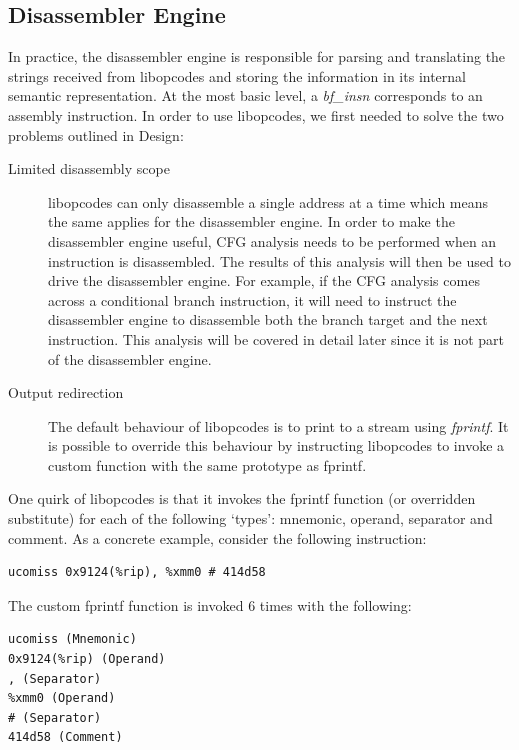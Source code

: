 \subsection{Disassembler Engine}

In practice, the disassembler engine is responsible for parsing and translating the strings received from libopcodes and storing the information in its internal semantic representation. At the most basic level, a \emph{bf\_insn} corresponds to an assembly instruction. In order to use libopcodes, we first needed to solve the two problems outlined in Design:

\begin{description}
\item [Limited disassembly scope] libopcodes can only disassemble a single address at a time which means the same applies for the disassembler engine. In order to make the disassembler engine useful, CFG analysis needs to be performed when an instruction is disassembled. The results of this analysis will then be used to drive the disassembler engine. For example, if the CFG analysis comes across a conditional branch instruction, it will need to instruct the disassembler engine to disassemble both the branch target and the next instruction. This analysis will be covered in detail later since it is not part of the disassembler engine.
\item [Output redirection] The default behaviour of libopcodes is to print to a stream using \emph{fprintf}. It is possible to override this behaviour by instructing libopcodes to invoke a custom function with the same prototype as fprintf.
\end{description}

One quirk of libopcodes is that it invokes the fprintf function (or overridden substitute) for each of the following `types': mnemonic, operand, separator and comment. As a concrete example, consider the following instruction:

\noindent\begin{minipage}{\textwidth}
\begin{lstlisting}[language={[x86masm]Assembler},caption={Example instruction disassembled by libopcodes.}]
ucomiss 0x9124(%rip), %xmm0 # 414d58
\end{lstlisting}
\end{minipage}

The custom fprintf function is invoked 6 times with the following:

\noindent\begin{minipage}{\textwidth}
\begin{lstlisting}[language={[x86masm]Assembler},caption={Strings received by custom fprintf. Type information is included for the benefit of the reader but is not given by libopcodes.}]
ucomiss (Mnemonic)
0x9124(%rip) (Operand)
, (Separator)
%xmm0 (Operand)
# (Separator)
414d58 (Comment)
\end{lstlisting}
\end{minipage}

